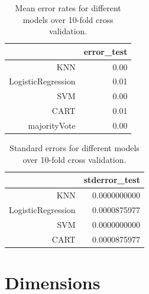 \documentclass[a4paper,draft=false]{scrreprt}\usepackage[]{graphicx}\usepackage[]{color}
\begin{document}
\begin{table}[ht]
\centering
\begin{tabular}{rr}
  \hline
 & error\_test \\ 
  \hline
KNN & 0.00 \\ 
  LogisticRegression & 0.01 \\ 
  SVM & 0.00 \\ 
  CART & 0.01 \\ 
  majorityVote & 0.00 \\ 
   \hline
\end{tabular}
\caption{Mean error rates for different models over 10-fold cross validation.\label{table:meanerror}} 
\end{table}
\begin{table}[ht]
\centering
\begin{tabular}{rr}
  \hline
 & stderror\_test \\ 
  \hline
KNN & 0.0000000000 \\ 
  LogisticRegression & 0.0000875977 \\ 
  SVM & 0.0000000000 \\ 
  CART & 0.0000875977 \\ 
   \hline
\end{tabular}
\caption{Standard errors for different models over 10-fold cross validation.\label{table:stderror}} 
\end{table}


\chapter{Dimensions} %


\appendix
\appendixpage
\end{document}
